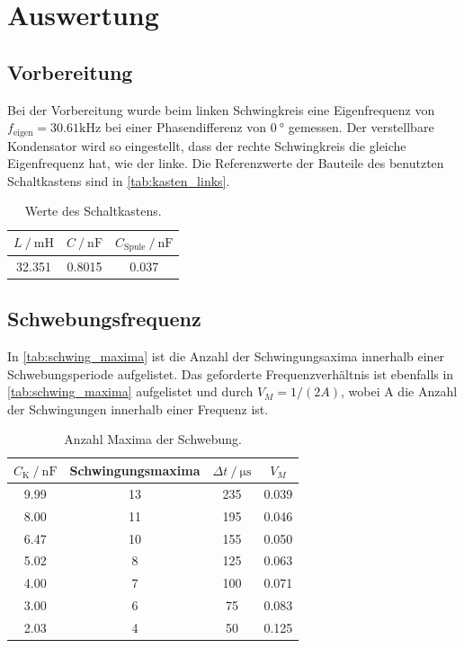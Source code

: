 \section{Auswertung}
\label{sec:Auswertung}

\subsection{Vorbereitung}
Bei der Vorbereitung wurde beim linken Schwingkreis eine Eigenfrequenz von $f_{\text{eigen}}=30.61 \si{\kilo\hertz}$ bei einer
Phasendifferenz von $\SI{0}{\degree}$ gemessen. 
Der verstellbare Kondensator wird so eingestellt, dass der rechte Schwingkreis die gleiche Eigenfrequenz hat, wie der linke.
Die Referenzwerte der Bauteile des benutzten Schaltkastens sind in \autoref{tab:kasten_links}.


\begin{table}[H]
  \centering
  \caption{Werte des Schaltkastens.}
  \label{tab:kasten_links}
  \begin{tabular}{c c c}
      \toprule
      {$L \:/\: \si{\milli\henry} $} & $C \:/\: \si{\nano\farad} $ & $C_{\text{Spule}}\:/\: \si{\nano\farad}$ \\
      \midrule
      32.351 & 0.8015 & 0.037 \\
      \bottomrule
  \end{tabular}
\end{table}


\subsection{Schwebungsfrequenz}
In \autoref{tab:schwing_maxima} ist die Anzahl der Schwingungsaxima innerhalb einer Schwebungsperiode aufgelistet.
Das geforderte Frequenzverhältnis ist ebenfalls in \autoref{tab:schwing_maxima} aufgelistet und durch $V_M  = 1/(2A) $, wobei A die Anzahl
der Schwingungen innerhalb einer Frequenz ist.

\begin{table}[H]
  \centering
  \caption{Anzahl Maxima der Schwebung.}
  \label{tab:schwing_maxima}
  \begin{tabular}{c c c c}
      \toprule
      {$C_{\text{K}} \:/\: \si{\nano\farad}$} & Schwingungsmaxima & $\Delta t\:/\: \si{\micro\second}$ & $V_M$ \\
      \midrule
      9.99 & 13 & 235 & 0.039 \\ 
      8.00 & 11 & 195 & 0.046 \\ 
      6.47 & 10 & 155 & 0.050 \\ 
      5.02 & 8 & 125 & 0.063 \\ 
      4.00 & 7 & 100 & 0.071 \\
      3.00 & 6 & 75 & 0.083 \\
      2.03 & 4 & 50 & 0.125 \\ 
      \bottomrule
  \end{tabular}
\end{table}

